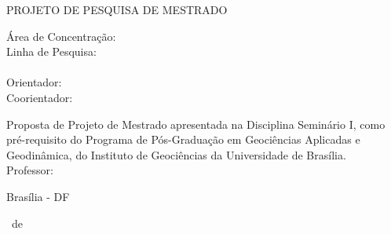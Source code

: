 \begin{center}
	\MakeUppercase{Projeto de Pesquisa de Mestrado \\
	\titulonome}
\end{center}

\vspace{1cm}	

\begin{center}
	Área de Concentração: \areanome \\
	Linha de Pesquisa: \linhapesquisanome \\
	\candidatonome \\
	Orientador: \orientadornome \\
	Coorientador: \coorientadornome \\
\end{center}

\vspace{1cm}

\hfill \parbox{8.5cm} {\noindent Proposta de Projeto de Mestrado apresentada na Disciplina Seminário I, como pré-requisito do Programa de Pós-Graduação em Geociências Aplicadas e Geodinâmica, do Instituto de Geociências da Universidade de Brasília. \\
Professor: \professordisciplinanome
}
\vfill

\vspace{0.5cm}

\begin{center}
Brasília - DF

\mesnome ~de \anonome
\end{center}

\clearpage
\setcounter{page}{1}